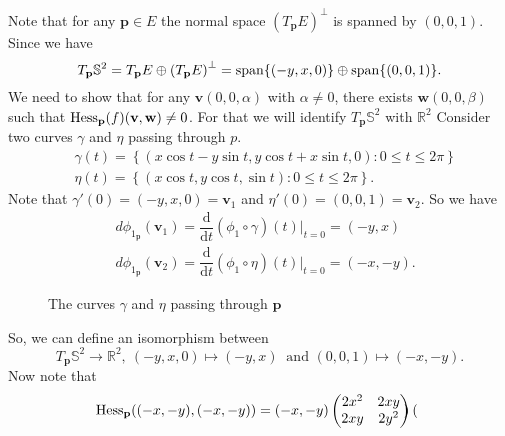 \begin{eg}
\begin{displaymath}
    \end{displaymath}     
    Note that for any $\mathbf{p}\in E$ the normal space $\left(T_\mathbf{p}E\right)^\perp$ is spanned by $(0,0,1)$. Since we have 
    \begin{displaymath}
        T_\mathbf{p}\mathbb{S}^2 =T_\mathbf{p}E\oplus \left(T_\mathbf{p}E\right)^\perp = \operatorname{span}\{(-y,x,0)\} \oplus \operatorname{span}\{(0,0,1)\}.
    \end{displaymath}
    We need to show that for any $\mathbf{v}(0,0,\alpha)$ with $\alpha\neq 0$, there exists $\mathbf{w}(0,0,\beta)$ such that $\mathrm{Hess}_\mathbf{p}(f)(\mathbf{v},\mathbf{w})\neq 0$. For that we will identify $T_\mathbf{p}\mathbb{S}^2$ with $\mathbb{R}^2$ Consider two curves $\gamma$ and $\eta$ passing through $p$.
    \begin{align*}
        & \gamma(t) = \left\{(x\cos t-y\sin t,y\cos t+x\sin t,0):0\le t\le 2\pi\right\}\\
        & \eta(t) = \left\{(x\cos t,y\cos t,\sin t):0\le t\le 2\pi\right\}.
    \end{align*}
    Note that $\gamma'(0)=(-y,x,0)=\mathbf{v}_1$ and $\eta'(0)=(0,0,1)=\mathbf{v}_2$. So we have
    \begin{align*}
        & d\phi_{1_\mathbf{p}} \left(\mathbf{v}_1\right)=\dfrac{\mathrm{d}}{\mathrm{d}t}\left(\phi_1\circ \gamma\right)(t)\big|_{t=0} =(-y,x) \\[1ex]
        & d\phi_{1_\mathbf{p}} \left(\mathbf{v}_2\right)=\dfrac{\mathrm{d}}{\mathrm{d}t}\left(\phi_1\circ \eta\right)(t)\big|_{t=0} =(-x,-y).
    \end{align*}
    \begin{figure}[H]
        \centering
        \caption{The curves $\gamma$ and $\eta$ passing through $\mathbf{p}$ \label{fig:curvesOnCircle}}
    \end{figure}
    \noindent So, we can define an isomorphism between
    \begin{displaymath}
        T_\mathbf{p}\mathbb{S}^2\to \mathbb{R}^2,~(-y,x,0)\mapsto (-y,x)~\text{ and } (0,0,1)\mapsto (-x,-y).
    \end{displaymath}
    Now note that
    \begin{align*}
        \mathrm{Hess}_{\mathbf{p}}((-x,-y),(-x,-y)) & = (-x,-y) \begin{pmatrix}
            2x^2 & 2xy \\ 2xy & 2y^2
        \end{pmatrix}
        \begin{pmatrix}

\end{pmatrix}
\end{align*}
\end{eg}

